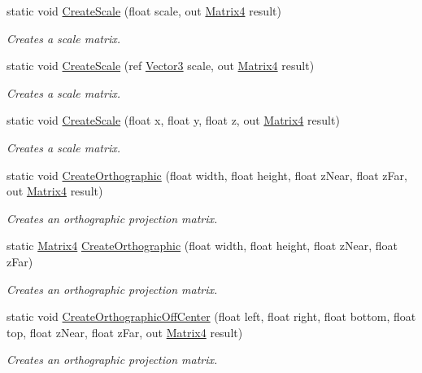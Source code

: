 \begin{DoxyCompactItemize}
static void \hyperlink{struct_open_t_k_1_1_matrix4_a3e656c06521033c642682a0d7702c22b}{Create\-Scale} (float scale, out \hyperlink{struct_open_t_k_1_1_matrix4}{Matrix4} result)
\begin{DoxyCompactList}\small\item\em Creates a scale matrix. \end{DoxyCompactList}\item 
static void \hyperlink{struct_open_t_k_1_1_matrix4_aad8a0fc7a76382e3c58a86edd618e81b}{Create\-Scale} (ref \hyperlink{struct_open_t_k_1_1_vector3}{Vector3} scale, out \hyperlink{struct_open_t_k_1_1_matrix4}{Matrix4} result)
\begin{DoxyCompactList}\small\item\em Creates a scale matrix. \end{DoxyCompactList}\item 
static void \hyperlink{struct_open_t_k_1_1_matrix4_adfc677db6aa3282addf2e6ecb6cb2c61}{Create\-Scale} (float x, float y, float z, out \hyperlink{struct_open_t_k_1_1_matrix4}{Matrix4} result)
\begin{DoxyCompactList}\small\item\em Creates a scale matrix. \end{DoxyCompactList}\item 
static void \hyperlink{struct_open_t_k_1_1_matrix4_ad12e94e37a35272b019493ec5d3a035a}{Create\-Orthographic} (float width, float height, float z\-Near, float z\-Far, out \hyperlink{struct_open_t_k_1_1_matrix4}{Matrix4} result)
\begin{DoxyCompactList}\small\item\em Creates an orthographic projection matrix. \end{DoxyCompactList}\item 
static \hyperlink{struct_open_t_k_1_1_matrix4}{Matrix4} \hyperlink{struct_open_t_k_1_1_matrix4_af047746614a81976f5a7200a06600725}{Create\-Orthographic} (float width, float height, float z\-Near, float z\-Far)
\begin{DoxyCompactList}\small\item\em Creates an orthographic projection matrix. \end{DoxyCompactList}\item 
static void \hyperlink{struct_open_t_k_1_1_matrix4_a731152de7d4b472612451f8f36d3719f}{Create\-Orthographic\-Off\-Center} (float left, float right, float bottom, float top, float z\-Near, float z\-Far, out \hyperlink{struct_open_t_k_1_1_matrix4}{Matrix4} result)
\begin{DoxyCompactList}\small\item\em Creates an orthographic projection matrix. \end{DoxyCompactList}\item 

\end{DoxyCompactItemize}
